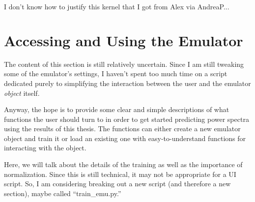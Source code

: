 I don't know how to justify this kernel that I got from Alex via AndreaP...

\section{Accessing and Using the Emulator}


The content of this section is still relatively uncertain. Since I am still tweaking some of the emulator's settings, I haven't spent too much time on a script dedicated purely to simplifying the interaction between the user and the emulator \textit{object} itself.

Anyway, the hope is to provide some clear and simple descriptions of what functions the user should turn to in order to get started predicting power spectra using the results of this thesis. The functions can either create a new emulator object and train it or load an existing one with easy-to-understand functions for interacting with the object.

Here, we will talk about the details of the training as well as the importance of normalization. Since this is still technical, it may not be appropriate for a UI script. So, I am considering breaking out a new script (and therefore a new section), maybe called ``train\_emu.py.''
